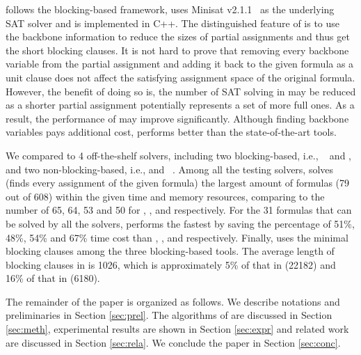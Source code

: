 \tool follows the blocking-based framework, uses Minisat v2.1.1~\cite{minisat} as the underlying SAT solver and is implemented in C++. The distinguished feature of \tool is to use the backbone information to reduce the sizes of partial assignments and thus get the short blocking clauses. It is not hard to prove that removing every backbone variable from the partial assignment and adding it back to the given formula as a unit clause does not affect the satisfying assignment space of the original formula. However, the benefit of doing so is, the number of SAT solving in \tool may be reduced as a shorter partial assignment potentially represents a set of more full ones. As a result, the performance of \tool may improve significantly. Although finding backbone variables pays additional cost, \tool performs better than the state-of-the-art tools.

We compared \tool to 4 off-the-shelf solvers, including two blocking-based, i.e., \ctool~\cite{ctool} and \bc, and two non-blocking-based, i.e., \nbc and \bdd~\cite{ietool}. Among all the testing solvers, \tool solves (finds every assignment of the given formula) the largest amount of formulas (79 out of 608) within the given time and memory resources, comparing to the number of 65, 64, 53 and 50 for \ctool, \bc, \nbc and \bdd  respectively. 
For the 31 formulas that can be solved by all the solvers, \tool performs the fastest by saving the percentage of 51\%, 48\%, 54\% and 67\% time cost than \ctool, \bc, \nbc and \bdd respectively.
Finally, \tool uses the minimal blocking clauses among the three blocking-based tools. The average length of blocking clauses in \tool is 1026, which is approximately 5\% of that in \ctool (22182) and 16\% of that in \bc (6180). 

The remainder of the paper is organized as follows. We describe notations and preliminaries in Section \ref{sec:prel}. The algorithms of \tool are discussed in Section \ref{sec:meth}, experimental results are shown in Section \ref{sec:expr} and related work are discussed in Section \ref{sec:rela}. We conclude the paper in Section \ref{sec:conc}.

